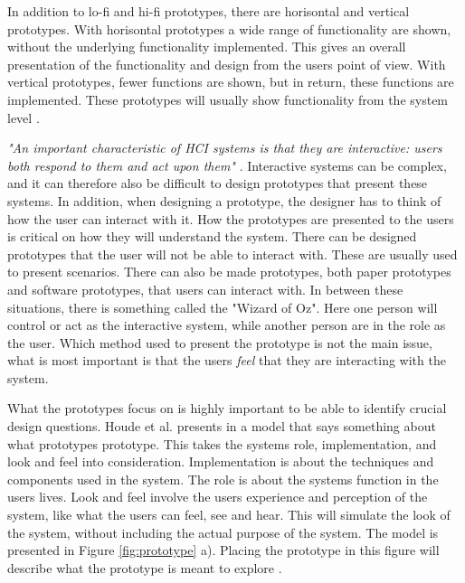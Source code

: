 In addition to lo-fi and hi-fi prototypes, there are horisontal and vertical prototypes. With horisontal prototypes a wide range of functionality are shown, without the underlying functionality implemented. This gives an overall presentation of the functionality and design from the users point of view. With vertical prototypes, fewer functions are shown, but in return, these functions are implemented. These prototypes will usually show functionality from the system level \cite{mackayprototyping} \cite{horver}.

\emph{"An important characteristic of HCI systems is that they are interactive: users both respond to them and act upon them"} \cite{mackayprototyping}. Interactive systems can be complex, and it can therefore also be difficult to design prototypes that present these systems. In addition, when designing a prototype, the designer has to think of how the user can interact with it. How the prototypes are presented to the users is critical on how they will understand the system. There can be designed prototypes that the user will not be able to interact with. These are usually used to present scenarios. There can also be made prototypes, both paper prototypes and software prototypes, that users can interact with. In between these situations, there is something called the "Wizard of Oz". Here one person will control or act as the interactive system, while another person are in the role as the user. Which method used to present the prototype is not the main issue, what is most important is that the users \emph{feel} that they are interacting with the system.

What the prototypes focus on is highly important to be able to identify crucial design questions. Houde et al. presents in \cite{houde1997prototypes} a model that says something about what prototypes prototype. This takes the systems role, implementation, and look and feel into consideration. Implementation is about the techniques and components used in the system. The role is about the systems function in the users lives. Look and feel involve the users experience and perception of the system, like what the users can feel, see and hear. This will simulate the look of the system, without including the actual purpose of the system. The model is presented in Figure \ref{fig:prototype} a). Placing the prototype in this figure will describe what the prototype is meant to explore \cite{houde1997prototypes}.    

